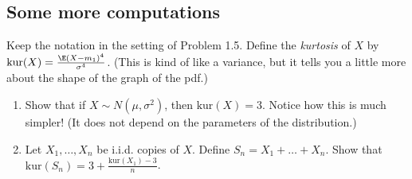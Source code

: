 \documentclass[12pt,reqno]{amsart}
\theoremstyle{definition}
\theoremstyle{remark}
\numberwithin{equation}{section}
\begin{document}
\subsection{Some more computations}
Keep the notation in the setting of Problem 1.5. Define the \emph{kurtosis} of $X$ by $\mathrm{kur}(X)=\frac{\E(X-m_{1})^{4}}{\sigma^{4}}$. (This is kind of like a variance, but it tells you a little more about the shape of the graph of the pdf.)
\begin{enumerate}
\item Show that if $X\sim N(\mu,\sigma^{2})$, then $\mathrm{kur}(X)=3$. Notice how this is much simpler! (It does not depend on the parameters of the distribution.)
\item Let $X_{1},\ldots,X_{n}$ be i.i.d. copies of $X$. Define $S_{n}=X_{1}+\ldots+X_{n}$. Show that $\mathrm{kur}(S_{n})=3+\frac{\mathrm{kur}(X_{1})-3}{n}$.
\end{enumerate}
\end{document}
